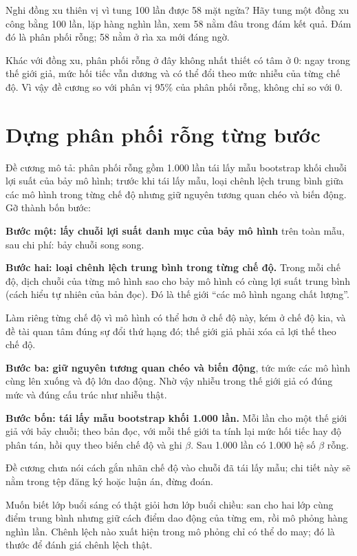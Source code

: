 Nghi đồng xu thiên vị vì tung 100 lần được 58 mặt ngửa? Hãy tung một đồng xu công bằng 100 lần, lặp hàng nghìn lần, xem 58 nằm đâu trong đám kết quả. Đám đó là phân phối rỗng; 58 nằm ở rìa xa mới đáng ngờ.

Khác với đồng xu, phân phối rỗng ở đây không nhất thiết có tâm ở 0: ngay trong thế giới giả, mức hối tiếc vẫn dương và có thể đổi theo mức nhiễu của từng chế độ. Vì vậy đề cương so với phân vị 95\% của phân phối rỗng, không chỉ so với 0.

\section{Dựng phân phối rỗng từng bước}

Đề cương mô tả: phân phối rỗng gồm 1.000 lần tái lấy mẫu bootstrap khối chuỗi lợi suất của bảy mô hình; trước khi tái lấy mẫu, loại chênh lệch trung bình giữa các mô hình trong từng chế độ nhưng giữ nguyên tương quan chéo và biến động. Gỡ thành bốn bước:

\textbf{Bước một: lấy chuỗi lợi suất danh mục của bảy mô hình} trên toàn mẫu, sau chi phí: bảy chuỗi song song.

\textbf{Bước hai: loại chênh lệch trung bình trong từng chế độ.} Trong mỗi chế độ, dịch chuỗi của từng mô hình sao cho bảy mô hình có cùng lợi suất trung bình (cách hiểu tự nhiên của bản đọc). Đó là thế giới “các mô hình ngang chất lượng”.

Làm riêng từng chế độ vì mô hình có thể hơn ở chế độ này, kém ở chế độ kia, và đề tài quan tâm đúng sự đổi thứ hạng đó; thế giới giả phải xóa cả lợi thế theo chế độ.

\textbf{Bước ba: giữ nguyên tương quan chéo và biến động}, tức mức các mô hình cùng lên xuống và độ lớn dao động. Nhờ vậy nhiễu trong thế giới giả có đúng mức và đúng cấu trúc như nhiễu thật.

\textbf{Bước bốn: tái lấy mẫu bootstrap khối 1.000 lần.} Mỗi lần cho một thế giới giả với bảy chuỗi; theo bản đọc, với mỗi thế giới ta tính lại mức hối tiếc hay độ phân tán, hồi quy theo biến chế độ và ghi \texorpdfstring{$\beta$}{beta}. Sau 1.000 lần có 1.000 hệ số \texorpdfstring{$\beta$}{beta} rỗng.

Đề cương chưa nói cách gắn nhãn chế độ vào chuỗi đã tái lấy mẫu; chi tiết này sẽ nằm trong tệp đăng ký hoặc luận án, đừng đoán.

Muốn biết lớp buổi sáng có thật giỏi hơn lớp buổi chiều: san cho hai lớp cùng điểm trung bình nhưng giữ cách điểm dao động của từng em, rồi mô phỏng hàng nghìn lần. Chênh lệch nào xuất hiện trong mô phỏng chỉ có thể do may; đó là thước để đánh giá chênh lệch thật.

